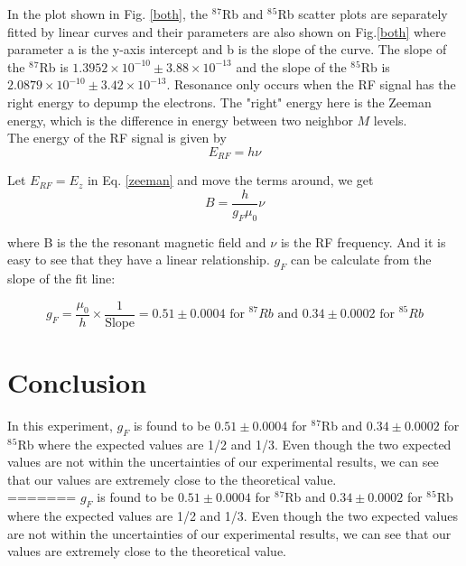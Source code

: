 \documentclass[prb,preprint]{revtex4-1}
\begin{document}
In the plot shown in Fig. \ref{both}, the $^8$$^7$Rb and $^8$$^5$Rb scatter plots are separately fitted by linear curves and their parameters are also shown on Fig.\ref{both} where parameter a is the y-axis intercept and b is the slope of the curve. The slope of the $^8$$^7$Rb is $1.3952\times 10^{-10} \pm 3.88 \times 10^{-13}$ and the slope of the $^8$$^5$Rb is $2.0879 \times 10^{-10} \pm 3.42 \times 10^{-13}$. Resonance only occurs when the RF signal has the right energy to depump the electrons. The "right" energy here is the Zeeman energy, which is the difference in energy between two neighbor $M$ levels. \\

The energy of the RF signal is given by
\begin{equation}
E_{RF}=h\nu
\label{rfenergy}
\end{equation}

Let $E_{RF}=E_{z}$ in Eq. \ref{zeeman} and move the terms around, we get
\begin{equation}
B=\frac{h}{g_{F}\mu_{0}}\nu
\label{bandf}
\end{equation}

where B is the the resonant magnetic field and $\nu$ is the RF frequency. And it is easy to see that they have a linear relationship. $g_{F}$ can be calculate from the slope of the fit line:

\begin{equation}
g_{F}=\frac{\mu_{0}}{h} \times \frac{1}{\textrm{Slope}}=0.51\pm0.0004 \textrm{ for } ^{87}Rb \textrm{ and } 0.34\pm0.0002 \textrm{ for } ^{85}Rb
\label{gf}
\end{equation}


\section{Conclusion}

In this experiment, $g_{F}$ is found to be $0.51\pm0.0004$ for $^8$$^7$Rb and $0.34\pm0.0002$ for $^8$$^5$Rb where the expected values are 1/2 and 1/3. Even though the two expected values are not within the uncertainties of our experimental results, we can see that our values are extremely close to the theoretical value.\\

=======
$g_{F}$ is found to be $0.51\pm0.0004$ for $^8$$^7$Rb and $0.34\pm0.0002$ for $^8$$^5$Rb where the expected values are 1/2 and 1/3. Even though the two expected values are not within the uncertainties of our experimental results, we can see that our values are extremely close to the theoretical value.\\
\end{document}
